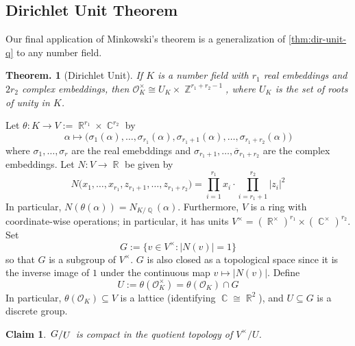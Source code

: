 \documentclass[11pt, a4paper]{memoir}
\DeclareMathOperator{\Q}{{\mathbb{Q}}}
\DeclareMathOperator{\Z}{{\mathbb{Z}}}
\DeclareMathOperator{\R}{{\mathbb{R}}}
\DeclareMathOperator{\C}{{\mathbb{C}}}
\newcommand{\ol}[1]{\ensuremath{\overline{#1}}}
\theoremstyle{change}
\newtheorem{theorem}{Theorem.}[section]
\theoremstyle{plain}
\newtheorem{claim}{Claim}
\theoremstyle{nonumberplain}
\newcommand{\quot}[2]{\mathchoice{\left.\raisebox{0.13em}{$#1$}\middle/\raisebox{-0.13em}{$#2$}\right.}
                                 {\left.\raisebox{0.07em}{$#1$}\middle/\raisebox{-0.07em}{$#2$}\right.}
                                 {\left.\raisebox{0.03em}{$#1$}\middle/\raisebox{-0.03em}{$#2$}\right.}
                                 {\left.\raisebox{0em}{$#1$}\middle/\raisebox{0em}{$#2$}\right.}}
\numberwithin{equation}{section}
\begin{document}
\subsection{Dirichlet Unit Theorem}
Our final application of Minkowski's theorem is a generalization of \cref{thm:dir-unit-q} to any number field.
\begin{theorem}[Dirichlet Unit]\label{thm:dir-unit}
    If $K$ is a number field with $r_1$ real embeddings and $2r_2$ complex embeddings, then $\mathcal{O}_K^\times\cong U_K\times\Z^{r_1+r_2-1}$, where $U_K$ is the set of roots of unity in $K$.
\end{theorem}
Let $\theta:K\to V:=\R^{r_1}\times\C^{r_2}$ by
\begin{equation*}
    \alpha\mapsto\bigl(\sigma_1(\alpha),\ldots,\sigma_{r_1}(\alpha),\sigma_{r_1+1}(\alpha),\ldots,\sigma_{r_1+r_2}(\alpha)\bigr)
\end{equation*}
where $\sigma_1,\ldots,\sigma_r$ are the real emebddings and $\sigma_{r_1+1},\ldots,\ol{\sigma}_{r_1+r_2}$ are the complex embeddings.
Let $N:V\to\R$ be given by
\begin{equation*}
    N\bigl(x_1,\ldots,x_{r_1},z_{r_1+1},\ldots,z_{r_1+r_2}\bigr)=\prod_{i=1}^{r_1}x_i\cdot\prod_{i=r_1+1}^{r_2}|z_i|^2
\end{equation*}
In particular, $N(\theta(\alpha))=N_{K/\Q}(\alpha)$.
Furthermore, $V$ is a ring with coordinate-wise operations; in particular, it has units $V^\times=(\R^\times)^{r_1}\times(\C^\times)^{r_2}$.
Set
\begin{equation*}
    G:=\{v\in V^\times:|N(v)|=1\}
\end{equation*}
so that $G$ is a subgroup of $V^\times$.
$G$ is also closed as a topological space since it is the inverse image of $1$ under the continuous map $v\mapsto|N(v)|$.
Define
\begin{equation*}
    U:=\theta(\mathcal{O}_K^\times)=\theta(\mathcal{O}_K)\cap G
\end{equation*}
In particular, $\theta(\mathcal{O}_K)\subseteq V$ is a lattice (identifying $\C\cong\R^2$), and $U\subseteq G$ is a discrete group.
\begin{claim}
    $\quot{G}{U}$ is compact in the quotient topology of $V^\times/U$.
\end{claim}
\end{document}
